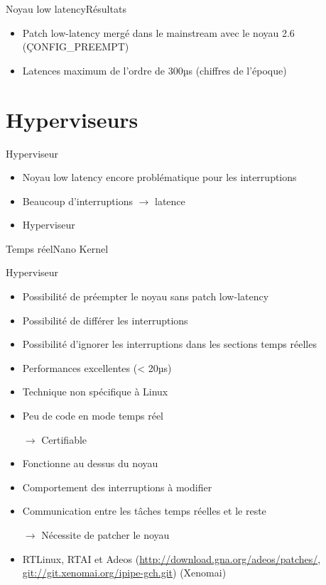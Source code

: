 \begin{frame}{Noyau low latency}{Résultats}
  \begin{itemize}
  \item Patch low-latency  mergé dans le mainstream avec  le noyau 2.6
    (\c{CONFIG_PREEMPT})
  \item Latences maximum de l'ordre de 300µs (chiffres de l'époque)
  \end{itemize}
\end{frame}

\section{Hyperviseurs}

\begin{frame}{Hyperviseur}
  \begin{itemize}
  \item Noyau low latency encore problématique pour les interruptions
  \item Beaucoup d'interruptions $\to$ latence
  \item Hyperviseur
  \end{itemize}
\end{frame}

\begin{frame}{Temps réel}{Nano Kernel}
  \begin{center}
    
  \end{center}
\end{frame}

\begin{frame}{Hyperviseur}
  \begin{itemize}
  \item Possibilité de préempter le noyau sans patch low-latency
  \item Possibilité de différer les interruptions
  \item  Possibilité  d'ignorer les  interruptions  dans les  sections
    temps réelles
  \item Performances excellentes (< 20µs)
  \item Technique non spécifique à Linux
  \item Peu de code en mode temps réel
  \item[$\to$] Certifiable

  \item Fonctionne au dessus du noyau
  \item Comportement des interruptions à modifier
  \item Communication entre les tâches temps réelles et le reste
  \item[$\to$] Nécessite de patcher le noyau

  \item           RTLinux,           RTAI           et           Adeos
    (\url{http://download.gna.org/adeos/patches/},
    \url{git://git.xenomai.org/ipipe-gch.git}) (Xenomai)
  \end{itemize}
\end{frame}

